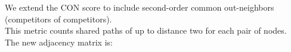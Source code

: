 \documentclass[preview]{standalone}
\begin{document}
We extend the CON score to include second-order common out-neighbors (competitors of competitors).\\This metric counts shared paths of up to distance two for each pair of nodes.\\The new adjacency matrix is:\\
\end{document}
